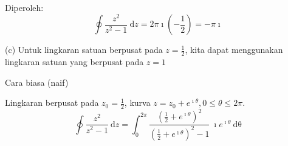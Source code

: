 Diperoleh:
\[
\oint\frac{z^{2}}{z^{2}-1}\ \mathrm{d}z=2\pi\imath\left(-\frac{1}{2}\right)=-\pi\imath
\]

(c) Untuk lingkaran satuan berpusat pada $z=\frac{1}{2}$, kita dapat
menggunakan lingkaran satuan yang berpusat pada $z=1$

Cara biasa (naif)

Lingkaran berpusat pada $z_{0}=\frac{1}{2}$, kurva $z=z_{0}+e^{\imath\theta},$$0\leq\theta\leq2\pi$.
\[
\oint\frac{z^{2}}{z^{2}-1}\ \mathrm{d}z=\int_{0}^{2\pi}\frac{\left(\frac{1}{2}+e^{\imath\theta}\right)^{2}}{\left(\frac{1}{2}+e^{\imath\theta}\right)^{2}-1}\ \imath e^{\imath\theta}\ \mathrm{d\theta}
\]









